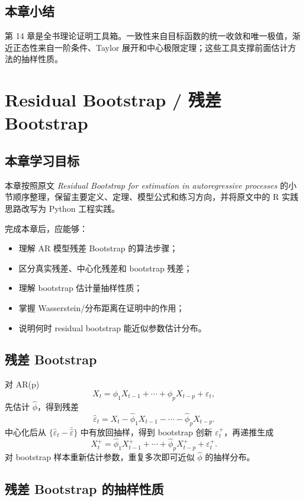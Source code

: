 \documentclass[11pt,a4paper,openany]{ctexbook}
\begin{document}
\section*{本章小结}

第 14 章是全书理论证明工具箱。一致性来自目标函数的统一收敛和唯一极值，渐近正态性来自一阶条件、Taylor 展开和中心极限定理；这些工具支撑前面估计方法的抽样性质。

\clearpage
\chapter{Residual Bootstrap / 残差 Bootstrap}
\section*{本章学习目标}

本章按照原文 \textit{Residual Bootstrap for estimation in autoregressive processes} 的小节顺序整理，保留主要定义、定理、模型公式和练习方向，并将原文中的 R 实践思路改写为 Python 工程实践。

完成本章后，应能够：
\begin{itemize}
  \item 理解 AR 模型残差 Bootstrap 的算法步骤；
  \item 区分真实残差、中心化残差和 bootstrap 残差；
  \item 理解 bootstrap 估计量抽样性质；
  \item 掌握 Wasserstein/分布距离在证明中的作用；
  \item 说明何时 residual bootstrap 能近似参数估计分布。
\end{itemize}

\section{残差 Bootstrap}

对 AR(p)
\[
  X_t=\phi_1X_{t-1}+\cdots+\phi_pX_{t-p}+\varepsilon_t,
\]
先估计 \(\hat\phi\)，得到残差
\[
  \hat\varepsilon_t=X_t-\hat\phi_1X_{t-1}-\cdots-\hat\phi_pX_{t-p}.
\]
中心化后从 \(\{\hat\varepsilon_t-\bar{\hat\varepsilon}\}\) 中有放回抽样，得到 bootstrap 创新 \(\varepsilon_t^+\)，再递推生成
\[
  X_t^+=\hat\phi_1X_{t-1}^++\cdots+\hat\phi_pX_{t-p}^+ + \varepsilon_t^+.
\]
对 bootstrap 样本重新估计参数，重复多次即可近似 \(\hat\phi\) 的抽样分布。

\section{残差 Bootstrap 的抽样性质}
\end{document}
